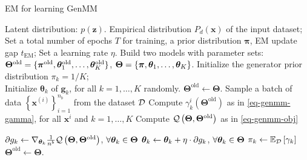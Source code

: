 \begin{algorithm}[!t]
  \caption{EM for learning GenMM}\label{flow-algo-em}
  \begin{algorithmic}[1]
    Latent distribution: $p(\bm{z})$. Empirical distribution $P_d(\bm{x})$ of the input dataset;
    \STATE Set a total number of epochs $T$ for training, a prior distribution $\bm{\pi}$, EM update gap $t_{\mathrm{EM}}$;
    \STATE  Set a learning rate $\eta$. 
    \STATE Build two models with parameter sets:
    \STATE ${\bm{\Theta}}^{\mathrm{old}}=\{ \bm{\pi}^{\mathrm{old}},
    \bm{\theta}_1^{\mathrm{old}},\hdots,
    \bm{\theta}_K^{\mathrm{old}} \}$,
    \STATE ${\bm{\Theta}} = \{ \bm{\pi},
    \bm{\theta}_1,\hdots, \bm{\theta}_K \}$.
    \STATE Initialize the generator prior distribution $\pi_k = 1/K$;\\ Initialize $\bm{\theta}_k$ of $\bm{g}_k$, for all $k=1,\dots,K$ randomly. 
    \STATE $\bm{\Theta}^{\mathrm{old}} \gets \bm{\Theta}$.
    \STATE Sample a batch of data $\left\{ \bm{x}^{(i)}
    \right\}_{i=1}^{n_b}$ from the dataset $\mathcal{D}$ 
    \STATE Compute $\gamma_k^{i}(\bm{\Theta}^{\mathrm{old}})$ as in \eqref{eq-genmm-gamma},
    for all $\bm{x}^{i}$ and $k=1, \dots, K$
    \STATE Compute
    $\mathcal{Q}\left(\bm{\Theta},\bm{\Theta}^{\mathrm{old}}\right)$ as in \eqref{eq-genmm-obj}%
    
    \STATE $\partial{g_k} \gets \nabla_{\bm{\theta}_k} \frac{1}{n^{b}}\mathcal{Q}\left(
      \bm{\Theta}, \bm{\Theta}^{\mathrm{old}}\right)$,
    $\forall \bm{\theta}_k \in \bm{\Theta}$
    \STATE $\bm{\theta}_k \gets \bm{\theta}_k + \eta \cdot \partial{g_k}$, $\forall \bm{\theta}_k \in \bm{\Theta}$
    \ENDFOR
    \STATE $\pi_k \gets \mathbb{E}_{\mathcal{D}}\left[ \gamma_k \right]$ %
    \STATE $\bm{\Theta}^{\mathrm{old}} \gets \bm{\Theta}$.
    \ENDIF
    \ENDFOR
  \end{algorithmic}
\end{algorithm}


